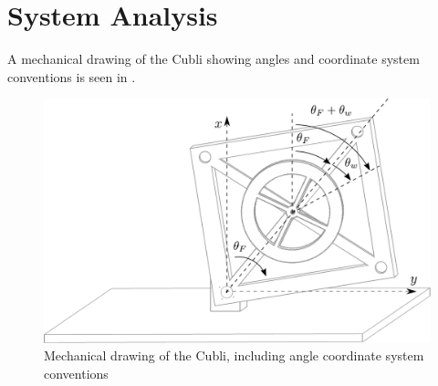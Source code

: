 \chapter{System Analysis}
A mechanical drawing of the Cubli showing angles and coordinate system conventions is seen in .

\begin{figure}[H]
 \centering
 \includegraphics[scale=0.6]{figures/mechanicalSystem}
 \caption{Mechanical drawing of the Cubli, including angle coordinate system conventions}
 \label{cubliMechanical}
\end{figure} 